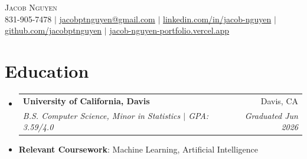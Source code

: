 \documentclass[letterpaper,10.5pt]{article}
\makeatletter
\newcommand{\resumeSubheading}[4]{
  \vspace{-2pt}\item
    \begin{tabular*}{0.97\textwidth}[t]{l@{\extracolsep{\fill}}r}
      \textbf{\normalsize #1} & \normalsize #2 \\[-1pt]
      \textit{\small#3} & \textit{\small #4} \\
    \end{tabular*}\vspace{-7pt}
}
\newcommand{\resumeSubHeadingListStart}{\begin{itemize}[leftmargin=0.15in, label={}]}
\newcommand{\resumeSubHeadingListEnd}{\end{itemize}}
\makeatother
\begin{document}
\begin{center}
    {\Huge \scshape Jacob Nguyen} \\ \vspace{1pt}
    \small 831-905-7478 $|$
    \href{mailto:jacobptnguyen@gmail.com}{jacobptnguyen@gmail.com} $|$
    \href{http://www.linkedin.com/in/jacob-nguyen-138267262}{linkedin.com/in/jacob-nguyen} $|$
    \href{https://github.com/jacobptnguyen}{github.com/jacobptnguyen} $|$
    \href{https://jacob-nguyen-portfolio.vercel.app/}{jacob-nguyen-portfolio.vercel.app}
\end{center}
\section{Education}
  \resumeSubHeadingListStart
    \resumeSubheading
      {University of California, Davis}{Davis, CA}
      {B.S. Computer Science, Minor in Statistics $|$ GPA: 3.59/4.0}{Graduated Jun 2026}
    \item[] \small\textbf{Relevant Coursework}: Machine Learning, Artificial Intelligence
  \resumeSubHeadingListEnd
\end{document}
